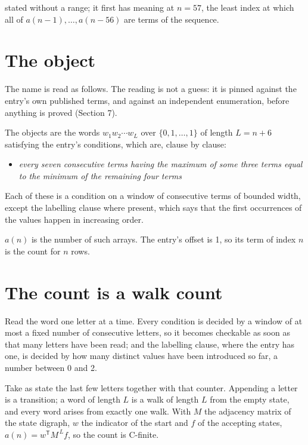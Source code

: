 \documentclass[11pt]{article}
\theoremstyle{definition}
\begin{document}
stated without a range; it first has meaning at $n = 57$, the least index at which all of $a(n-1),\dots,a(n-56)$ are terms of the sequence.

\section{The object}

The name is read as follows. The reading is not a guess: it is pinned against the entry's own published terms, and against an independent enumeration, before anything is proved (Section 7).

The objects are the words $w_1 w_2 \cdots w_L$ over $\{0,1,\dots,1\}$ of length $L = n + 6$ satisfying the entry's conditions, which are, clause by clause:

\begin{itemize}

\item {\itshape every seven consecutive terms having the maximum of some three terms equal to the minimum of the remaining four terms}

\end{itemize}

Each of these is a condition on a window of consecutive terms of bounded width, except the labelling clause where present, which says that the first occurrences of the values happen in increasing order.

$a(n)$ is the number of such arrays. The entry's offset is 1, so its term of index $n$ is the count for $n$ rows.

\section{The count is a walk count}

Read the word one letter at a time. Every condition is decided by a window of at most a fixed number of consecutive letters, so it becomes checkable as soon as that many letters have been read; and the labelling clause, where the entry has one, is decided by how many distinct values have been introduced so far, a number between $0$ and 2.

Take as state the last few letters together with that counter. Appending a letter is a transition; a word of length $L$ is a walk of length $L$ from the empty state, and every word arises from exactly one walk. With $M$ the adjacency matrix of the state digraph, $w$ the indicator of the start and $f$ of the accepting states, $a(n) = w^{\mathsf T}M^{\,L}f$, so the count is C-finite.
\end{document}
